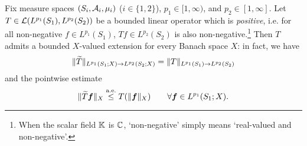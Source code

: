 \begin{thm}\label{thm:positive-extensions}
  Fix measure spaces $(S_i,\mathcal{A}_i,\mu_i)$ ($i \in \{1,2\}$), $p_1 \in [1,\infty)$, and $p_2 \in [1,\infty]$.
  Let $T \in \mathcal{L}(L^{p_1}(S_1),L^{p_2}(S_2))$ be a bounded linear operator which is \emph{positive}, i.e. for all non-negative $f \in L^{p_1}(S_1)$, $Tf \in L^{p_2}(S_2)$ is also non-negative.\footnote{When the scalar field $\mathbb{K}$ is $\mathbb{C}$, `non-negative' simply means `real-valued and non-negative'.}
  Then $T$ admits a bounded $X$-valued extension for every Banach space $X$: in fact, we have
  \begin{equation*}
    \|\widetilde{T}\|_{L^{p_1}(S_1;X) \to L^{p_2}(S_2;X)} = \|T\|_{L^{p_1}(S_1) \to L^{p_2}(S_2)}
  \end{equation*}
  and the pointwise estimate
  \begin{equation}\label{eq:positive-pw-est}
    \|\widetilde{T}\bm{f}\|_X \stackrel{\mathrm{a.e.}}{\leq} T(\|\bm{f}\|_X) \qquad \forall \bm{f} \in L^{p_1}(S_1;X).
  \end{equation}
  
\end{thm}

